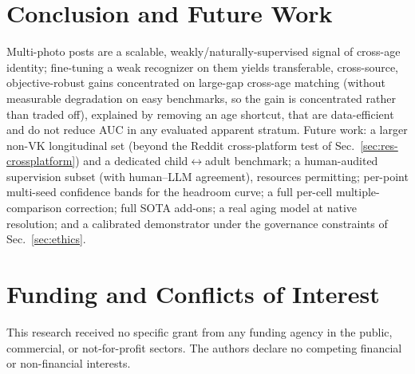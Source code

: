 \documentclass[journal]{IEEEtran}
\begin{document}
\section{Conclusion and Future Work}\label{sec:conclusion}
Multi-photo posts are a scalable, weakly/naturally-supervised signal of cross-age identity; fine-tuning a weak recognizer on them yields transferable, cross-source, objective-robust gains concentrated on large-gap cross-age matching (without measurable degradation on easy benchmarks, so the gain is concentrated rather than traded off), explained by removing an age shortcut, that are data-efficient and do not reduce AUC in any evaluated apparent stratum. Future work: a larger non-VK longitudinal set (beyond the Reddit cross-platform test of Sec.~\ref{sec:res-crossplatform}) and a dedicated child$\leftrightarrow$adult benchmark; a human-audited supervision subset (with human--LLM agreement), resources permitting; per-point multi-seed confidence bands for the headroom curve; a full per-cell multiple-comparison correction; full SOTA add-ons; a real aging model at native resolution; and a calibrated demonstrator under the governance constraints of Sec.~\ref{sec:ethics}.

\section*{Funding and Conflicts of Interest}
This research received no specific grant from any funding agency in the public, commercial, or not-for-profit sectors. The authors declare no competing financial or non-financial interests.



\end{document}
